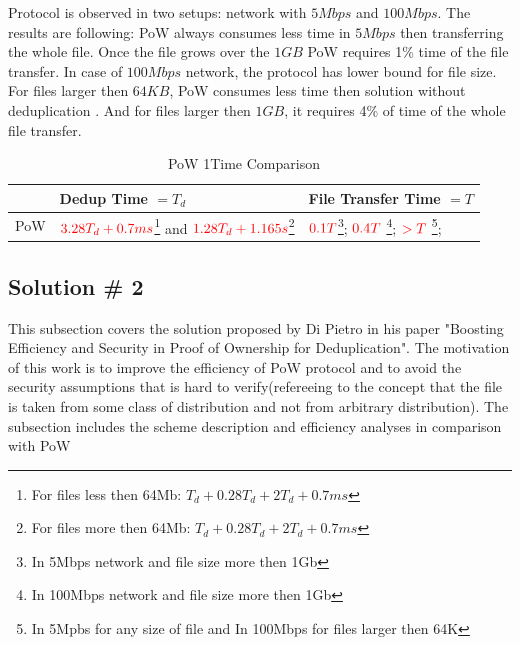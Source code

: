 \documentclass[12pt]{article}
\begin{document}
Protocol is observed in two setups: network with $5Mbps$ and $100Mbps$. The results are following: PoW always consumes less time in $5Mbps$ then transferring the whole file. Once the file grows over the $1GB$ PoW requires 1\%  time of the file transfer. In case of $100Mbps$ network, the protocol has lower bound for file size. For files larger then $64KB$, PoW consumes less time then solution without deduplication . And for files larger then $1GB$, it requires 4\% of time of the whole file transfer. 

\begin{savenotes}
\begin{table}[!htpb]
\centering
\addtolength{\tabcolsep}{3pt}
\begin{tabular}{|L{1cm}|L{4.5cm}|L{4.5cm}|}
\hline
&Dedup Time  $= T_d$ &File Transfer Time $=T$ \\
\hline
PoW & $\color{red} 3.28T_d+0.7ms$\footnote{For files less then 64Mb: $T_d+0.28T_d+2T_d+0.7ms$}  and $\color{red} 1.28T_d+1.165s$\footnote{For files more then 64Mb: $T_d+0.28T_d+2T_d+0.7ms$ } 
& $\color{red} 0.1T$\footnote{In 5Mbps network and file size more then 1Gb}; $\color{red} 0.4T$ \footnote{In 100Mbps network and file size more then 1Gb}; 
$\color{red} > T$ \footnote{In 5Mpbs for any size of file and In 100Mbps for files larger then 64K}; \\
\hline

\end{tabular}
\caption{PoW 1Time Comparison}
\label{table:paramProbCodes}
\end{table}
\end{savenotes}



\subsection{Solution \# 2}
\label{sub:Soltuion2}
This subsection covers the solution proposed by Di Pietro\cite{DiPietro} in his paper "Boosting Efficiency and Security in Proof of Ownership for Deduplication". The motivation of this work is to improve the efficiency of PoW\cite{PoW} protocol and to avoid the security  assumptions that is hard to verify(refereeing to the concept that the file is taken from some class of distribution and not from arbitrary distribution). The subsection includes the scheme description and efficiency analyses in comparison with PoW\cite{PoW} 
\end{document}
